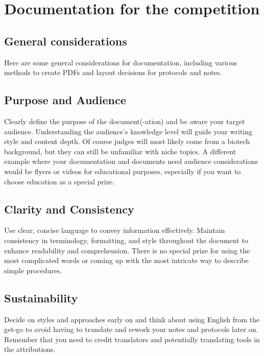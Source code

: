 


\section{Documentation for the competition}\label{sec:documentation-for-the-competition}

\subsection{General considerations} \label{subsec:general-considerations}
Here are some general considerations for documentation, including various methods to create PDFs and layout decisions for protocols and notes.
\subsection*{Purpose and Audience}
Clearly define the purpose of the document(-ation) and be aware your target audience.
Understanding the audience's knowledge level will guide your writing style and content depth.
Of course judges will most likely come from a biotech background, but they can still be unfamiliar with niche topics.
A different example where your documentation and documents need audience considerations would be flyers or videos for educational purposes, especially if you want to choose education as a special prize.

\subsection*{Clarity and Consistency}
Use clear, concise language to convey information effectively.
Maintain consistency in terminology, formatting, and style throughout the document to enhance readability and comprehension.
There is no special prize for using the most complicated words or coming up with the most intricate way to describe simple procedures.

\subsection*{Sustainability}
Decide on styles and approaches early on and think about using English from the get-go to avoid having to translate and rework your notes and protocols later on.
Remember that you need to credit translators and potentially translating tools in the attributions. 

